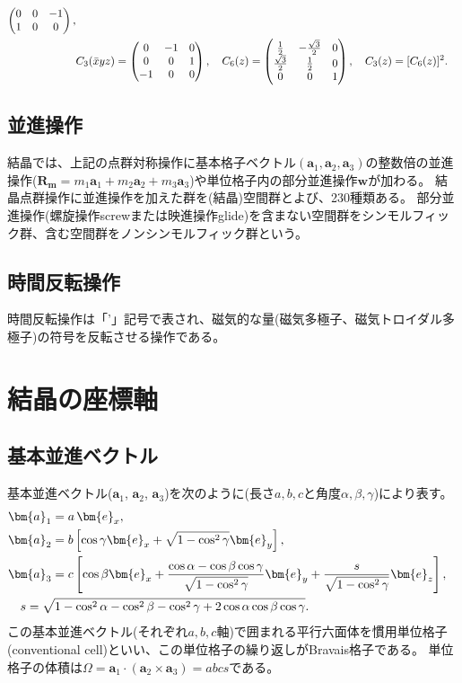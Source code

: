 \documentclass[11pt]{easymemo}
\begin{document}
\begin{align}
\begin{pmatrix}
    0 & 0  & -1 \\
    1 & 0  & 0
  \end{pmatrix},
  \cr &
  C_3(\bar{x}yz)=\begin{pmatrix}
    0  & -1 & 0 \\
    0  & 0  & 1 \\
    -1 & 0  & 0
  \end{pmatrix},
  \quad
  C_6(z)=\begin{pmatrix}
    \frac{1}{2}        & -\frac{\sqrt{3}}{2} & 0 \\
    \frac{\sqrt{3}}{2} & \frac{1}{2}         & 0 \\
    0                  & 0                   & 1
  \end{pmatrix},
  \quad
  C_3(z)=[C_{6}(z)]^{2}.
\end{align}

\subsection{並進操作}

結晶では、上記の点群対称操作に基本格子ベクトル$(\bm{a}_{1},\bm{a}_{2},\bm{a}_{3})$の整数倍の並進操作($\bm{R}_{\bm{m}}=m_{1}\bm{a}_{1}+m_{2}\bm{a}_{2}+m_{3}\bm{a}_{3}$)や単位格子内の部分並進操作$\bm{w}$が加わる。
結晶点群操作に並進操作を加えた群を(結晶)空間群とよび、230種類ある。
部分並進操作(螺旋操作screwまたは映進操作glide)を含まない空間群をシンモルフィック群、含む空間群をノンシンモルフィック群という。

\subsection{時間反転操作}
時間反転操作は「'」記号で表され、磁気的な量(磁気多極子、磁気トロイダル多極子)の符号を反転させる操作である。

\section{結晶の座標軸}

\subsection{基本並進ベクトル}

基本並進ベクトル($\bm{a}_{1}$, $\bm{a}_{2}$, $\bm{a}_{3}$)を次のように(長さ$a,b,c$と角度$\alpha,\beta,\gamma$)により表す。
\begin{align}
      &
  \bm{a}_{1}=a\,\bm{e}_{x},
  \cr &
  \bm{a}_{2}=b\left[\cos\gamma \bm{e}_{x}+\sqrt{1-\cos^{2}\gamma} \bm{e}_{y}\right],
  \cr &
  \bm{a}_{3}=c\left[\cos\beta\bm{e}_{x}+\frac{\cos\alpha-\cos\beta\cos\gamma}{\sqrt{1-\cos^{2}\gamma}}\bm{e}_{y}+\frac{s}{\sqrt{1-\cos^{2}\gamma}}\bm{e}_{z}\right],
  \cr & \quad
  s=\sqrt{1-\cos^{2}\alpha-\cos^{2}\beta-\cos^{2}\gamma+2\cos\alpha\cos\beta\cos\gamma}.
\end{align}
この基本並進ベクトル(それぞれ$a,b,c$軸)で囲まれる平行六面体を慣用単位格子(conventional cell)といい、この単位格子の繰り返しがBravais格子である。
単位格子の体積は$\Omega=\bm{a}_{1}\cdot(\bm{a}_{2}\times\bm{a}_{3})=abcs$である。
\end{document}
